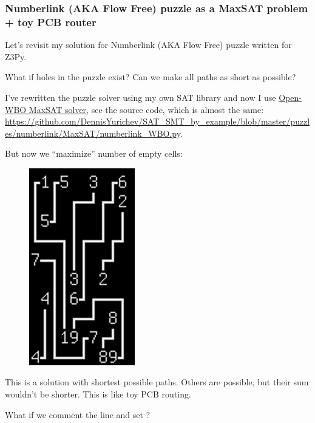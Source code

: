 \subsubsection{Numberlink (AKA Flow Free) puzzle as a MaxSAT problem + toy PCB router}

Let's revisit my solution for Numberlink (AKA Flow Free) puzzle written for Z3Py.

What if holes in the puzzle exist?
Can we make all paths as short as possible?

I've rewritten the puzzle solver using my own SAT library 
and now I use \href{http://sat.inesc-id.pt/open-wbo/}{Open-WBO MaxSAT solver},
see the source code, which is almost the same: \url{https://github.com/DennisYurichev/SAT_SMT_by_example/blob/master/puzzles/numberlink/MaxSAT/numberlink_WBO.py}.

But now we ``maximize'' number of empty cells:


\begin{figure}[H]
\centering
\includegraphics[scale=0.5]{puzzles/numberlink/MaxSAT/MaxSAT.png}
\caption{}
\end{figure}

This is a solution with shortest possible paths. Others are possible, but their sum wouldn't be shorter.
This is like toy PCB routing.

What if we comment the  line and set ?

